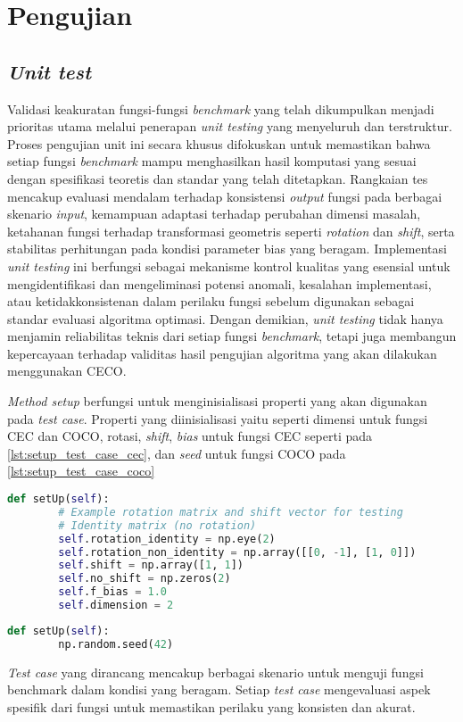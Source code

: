 \section{Pengujian}
\subsection{\textit{Unit test}}
Validasi keakuratan fungsi-fungsi \textit{benchmark} yang telah dikumpulkan menjadi prioritas utama melalui penerapan \textit{unit testing} yang menyeluruh dan terstruktur. Proses pengujian unit ini secara khusus difokuskan untuk memastikan bahwa setiap fungsi \textit{benchmark} mampu menghasilkan hasil komputasi yang sesuai dengan spesifikasi teoretis dan standar yang telah ditetapkan. Rangkaian tes mencakup evaluasi mendalam terhadap konsistensi \textit{output} fungsi pada berbagai skenario \textit{input}, kemampuan adaptasi terhadap perubahan dimensi masalah, ketahanan fungsi terhadap transformasi geometris seperti \textit{rotation} dan \textit{shift}, serta stabilitas perhitungan pada kondisi parameter bias yang beragam. Implementasi \textit{unit testing} ini berfungsi sebagai mekanisme kontrol kualitas yang esensial untuk mengidentifikasi dan mengeliminasi potensi anomali, kesalahan implementasi, atau ketidakkonsistenan dalam perilaku fungsi sebelum digunakan sebagai standar evaluasi algoritma optimasi. Dengan demikian, \textit{unit testing} tidak hanya menjamin reliabilitas teknis dari setiap fungsi \textit{benchmark}, tetapi juga membangun kepercayaan terhadap validitas hasil pengujian algoritma yang akan dilakukan menggunakan CECO.

\textit{Method setup} berfungsi untuk menginisialisasi properti yang akan digunakan pada \textit{test case}. Properti yang diinisialisasi yaitu seperti dimensi untuk fungsi CEC dan COCO, rotasi, \textit{shift}, \textit{bias} untuk fungsi CEC seperti pada \cref{lst:setup_test_case_cec}, dan \textit{seed} untuk fungsi COCO pada \cref{lst:setup_test_case_coco}
\begin{lstlisting}[language=Python, caption=\textit{setup unit test} fungsi CEC, label=lst:setup_test_case_cec]
    def setUp(self):
        # Example rotation matrix and shift vector for testing
        # Identity matrix (no rotation)
        self.rotation_identity = np.eye(2)
        self.rotation_non_identity = np.array([[0, -1], [1, 0]])
        self.shift = np.array([1, 1])
        self.no_shift = np.zeros(2)
        self.f_bias = 1.0
        self.dimension = 2
\end{lstlisting}
\begin{lstlisting}[language=Python, caption=\textit{setup unit test} fungsi COCO, label=lst:setup_test_case_coco]
    def setUp(self):
        np.random.seed(42)
\end{lstlisting}
\textit{Test case} yang dirancang mencakup berbagai skenario untuk menguji fungsi benchmark dalam kondisi yang beragam. Setiap \textit{test case} mengevaluasi aspek spesifik dari fungsi untuk memastikan perilaku yang konsisten dan akurat.

